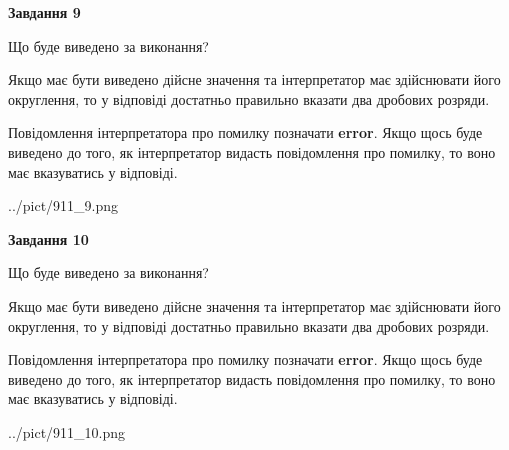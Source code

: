 \documentclass[12pt, ukrainian]{article}
\begin{document}
{\begin {Large}
{\begin {center}\textbf{Завдання 9}\end {center}}\par
Що буде виведено за виконання? \par

Якщо має бути виведено дійсне значення та інтерпретатор має здійснювати його округлення, 
то у відповіді достатньо правильно вказати два дробових розряди.

Повідомлення інтерпретатора про помилку позначати \textbf{error}.
Якщо щось буде виведено до того, як інтерпретатор видасть повідомлення про помилку, 
то воно має вказуватись у відповіді. \par

\begin{center}
	{../pict/911_9.png}
\end{center}
\newpage

{\begin {center}\textbf{Завдання 10}\end {center}}\par
Що буде виведено за виконання? \par

Якщо має бути виведено дійсне значення та інтерпретатор має здійснювати його округлення, 
то у відповіді достатньо правильно вказати два дробових розряди.

Повідомлення інтерпретатора про помилку позначати \textbf{error}.
Якщо щось буде виведено до того, як інтерпретатор видасть повідомлення про помилку, 
то воно має вказуватись у відповіді. \par

\begin{center}
	{../pict/911_10.png}
\end{center}
\newpage

\end {Large}}
\end{document}
